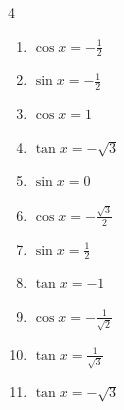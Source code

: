 \begin{multicols}{4}
\begin{enumerate}
  \item $\displaystyle \cos{x}  = -\frac{1}{2}$


  \item $\displaystyle \sin{x}  = -\frac{1}{2}$


  \item $\displaystyle \cos{x}  = 1$


\columnbreak %

\resetques

  \item $\displaystyle \tan{x}  = -\sqrt{3}$


  \item $\displaystyle \sin{x}  = 0$


  \item $\displaystyle \cos{x}  = -\frac{\sqrt{3}}{2}$


  \item $\displaystyle \sin{x}  = \frac{1}{2}$


  \item $\displaystyle \tan{x}  = -1$


  \item $\displaystyle \cos{x}  = -\frac{1}{\sqrt{2}}$


  \item $\displaystyle \tan{x}  = \frac{1}{\sqrt{3}}$


  \item $\displaystyle \tan{x}  = -\sqrt{3}$



\end{enumerate}
\end{multicols}
